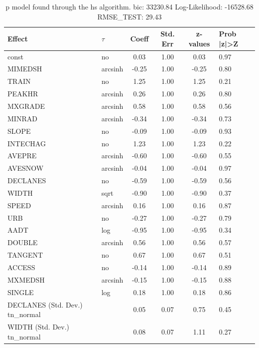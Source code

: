 \begin{table}
	\caption{p model found through the hs algorithm. bic: 33230.84 Log-Likelihood: -16528.68 RMSE_TEST: 29.43}
	\begin{center}
		\begin{tabular}{|l|l|c|c|c|l|}
			\hline
			Effect & $\tau$ & Coeff & Std. Err & z-values & Prob |z|>Z \\
			\hline
			const & no & 0.03 & 1.00 & 0.03 & 0.97 \\
			\hline
			MIMEDSH & arcsinh & -0.25 & 1.00 & -0.25 & 0.80 \\
			\hline
			TRAIN & no & 1.25 & 1.00 & 1.25 & 0.21 \\
			\hline
			PEAKHR & arcsinh & 0.26 & 1.00 & 0.26 & 0.80 \\
			\hline
			MXGRADE & arcsinh & 0.58 & 1.00 & 0.58 & 0.56 \\
			\hline
			MINRAD & arcsinh & -0.34 & 1.00 & -0.34 & 0.73 \\
			\hline
			SLOPE & no & -0.09 & 1.00 & -0.09 & 0.93 \\
			\hline
			INTECHAG & no & 1.23 & 1.00 & 1.23 & 0.22 \\
			\hline
			AVEPRE & arcsinh & -0.60 & 1.00 & -0.60 & 0.55 \\
			\hline
			AVESNOW & arcsinh & -0.04 & 1.00 & -0.04 & 0.97 \\
			\hline
			DECLANES & no & -0.59 & 1.00 & -0.59 & 0.56 \\
			\hline
			WIDTH & sqrt & -0.90 & 1.00 & -0.90 & 0.37 \\
			\hline
			SPEED & arcsinh & 0.16 & 1.00 & 0.16 & 0.87 \\
			\hline
			URB & no & -0.27 & 1.00 & -0.27 & 0.79 \\
			\hline
			AADT & log & -0.95 & 1.00 & -0.95 & 0.34 \\
			\hline
			DOUBLE & arcsinh & 0.56 & 1.00 & 0.56 & 0.57 \\
			\hline
			TANGENT & no & 0.67 & 1.00 & 0.67 & 0.51 \\
			\hline
			ACCESS & no & -0.14 & 1.00 & -0.14 & 0.89 \\
			\hline
			MXMEDSH & arcsinh & -0.15 & 1.00 & -0.15 & 0.88 \\
			\hline
			SINGLE & log & 0.18 & 1.00 & 0.18 & 0.86 \\
			\hline
			DECLANES (Std. Dev.) tn_normal &  & 0.05 & 0.07 & 0.75 & 0.45 \\
			\hline
			WIDTH (Std. Dev.) tn_normal &  & 0.08 & 0.07 & 1.11 & 0.27 \\

\end{tabular}
\end{center}
\end{table}
